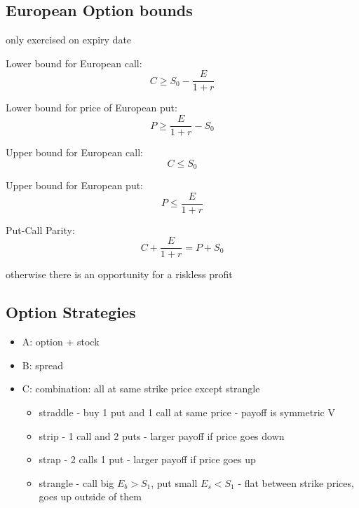 \documentclass[]{amsart}
\begin{document}
\subsection{European Option bounds} only exercised on expiry date

Lower bound for European call:
$$ C \geq S_0 - \frac{E}{1+r} $$ 

Lower bound for price of European put: 
$$ P \geq \frac{E}{1+r} - S_0 $$ 


Upper bound for European call:
$$ C \leq S_0 $$ 

Upper bound for European put: 
$$ P \leq \frac{E}{1+r} $$ 

Put-Call Parity:
$$ C + \frac{E}{1+r} = P + S_0 $$ 

otherwise there is an opportunity for a riskless profit 

\subsection{Option Strategies}

\begin{itemize}

\item A: option + stock
\item B: spread 
\item C: combination: all at same strike price except strangle 
\begin{itemize}
\item straddle - buy 1 put and 1 call at same price - payoff is symmetric V
\item strip - 1 call and 2 puts - larger payoff if price goes down
\item strap - 2 calls 1 put - larger payoff if price goes up 
\item strangle - call big $E_b>S_1$, put small $E_s<S_1$ - flat between strike prices, goes up outside of them 

\end{itemize}


\end{itemize}
\end{document}
